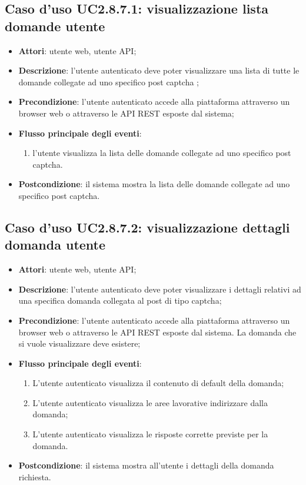 \subsection{Caso d'uso UC2.8.7.1: visualizzazione lista domande utente}
\begin{itemize}
\item \textbf{Attori}: utente web, utente API;
\item \textbf{Descrizione}: l'utente autenticato deve poter visualizzare una lista di tutte le domande collegate ad uno specifico post captcha
; 
      \item \textbf{Precondizione}: l'utente autenticato accede alla piattaforma attraverso un browser web o attraverso le API REST esposte dal sistema;

        \item \textbf{Flusso principale degli eventi}:
          \begin{enumerate}
          \item l'utente visualizza la lista delle domande collegate ad uno specifico post captcha.

      \end{enumerate}
    \item \textbf{Postcondizione}: il sistema mostra la lista delle domande collegate ad uno specifico post captcha.
  \end{itemize}
\hypertarget{UC2.8.7.2}{}
\subsection{Caso d'uso UC2.8.7.2: visualizzazione dettagli domanda utente}
\begin{itemize}
\item \textbf{Attori}: utente web, utente API;
\item \textbf{Descrizione}: l'utente autenticato deve poter visualizzare i dettagli relativi ad una specifica domanda collegata al post di tipo captcha; 
      \item \textbf{Precondizione}: l'utente autenticato accede alla piattaforma attraverso un browser web o attraverso le API REST esposte dal sistema. La domanda che si vuole visualizzare deve esistere;

        \item \textbf{Flusso principale degli eventi}:
          \begin{enumerate}
          \item L'utente autenticato visualizza il contenuto di default della domanda;
          \item L'utente autenticato visualizza le aree lavorative indirizzare dalla domanda;
          \item L'utente autenticato visualizza le risposte corrette previste per la domanda.

      \end{enumerate}
    \item \textbf{Postcondizione}: il sistema mostra all'utente i dettagli della domanda richiesta.
  \end{itemize}
\hypertarget{UC2.8.7.3}{}
